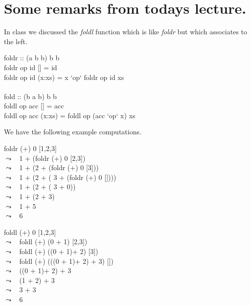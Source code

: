 \documentclass[11pt]{article}
\begin{document}

\section{Some remarks from todays  lecture.}
In class we discussed the {\em{foldl}} function which is like
{\em{foldr}} but which associates to the left.

\begin{program**}
\> foldr :: (a \arrow b \arrow b) \arrow b \arrow [a] \arrow b\\
\> foldr op id [] = id \\
\> foldr op id (x:xs) = x `op`  foldr op id xs \\
\> \\
\> fold :: (b \arrow a \arrow b) \arrow b \arrow [a] \arrow b\\
\> foldl op acc [] = acc \\
\> foldl op acc (x:xs) =  foldl op (acc `op` x) xs \\
\end{program**}

We have the following example computations.

\begin{program**}
\> foldr (+) 0  [1,2,3]\\
\> $\leadsto\;\;$ 1 + (foldr (+) 0 [2,3]) \\
\> $\leadsto\;\;$ 1 + (2 + (foldr (+) 0 [3])) \\
\> $\leadsto\;\;$ 1 + (2 + ( 3 + (foldr (+) 0 []))) \\
\> $\leadsto\;\;$ 1 + (2 + ( 3 + 0)) \\
\> $\leadsto\;\;$ 1 + (2 + 3) \\
\> $\leadsto\;\;$ 1 + 5 \\
\> $\leadsto\;\;$ 6 \\
\end{program**}


\begin{program**}
\> foldl (+) 0  [1,2,3]\\
\> $\leadsto\;\;$ foldl (+) (0 + 1) [2,3]) \\
\> $\leadsto\;\;$ foldl (+) ((0 + 1)+ 2) [3]) \\
\> $\leadsto\;\;$ foldl (+) (((0 + 1)+ 2) + 3) []) \\
\> $\leadsto\;\;$ ((0 + 1)+ 2) + 3 \\
\> $\leadsto\;\;$ (1 + 2) + 3 \\
\> $\leadsto\;\;$ 3 + 3 \\
\> $\leadsto\;\;$ 6 \\
\end{program**}
\end{document}
